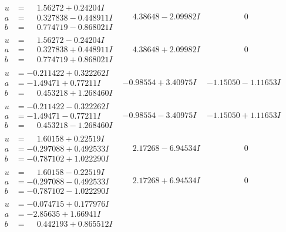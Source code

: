 \documentclass[1p]{elsarticle_modified}
\theoremstyle{definition}
\begin{document}
$$\begin{array}{c|c|c}
\begin{aligned}
u &= \phantom{-}1.56272 + 0.24204 I \\
a &= \phantom{-}0.327838 - 0.448911 I \\
b &= \phantom{-}0.774719 - 0.868021 I\end{aligned}
 & \phantom{-}4.38648 - 2.09982 I & \phantom{-0.000000 } 0 \\ \hline\begin{aligned}
u &= \phantom{-}1.56272 - 0.24204 I \\
a &= \phantom{-}0.327838 + 0.448911 I \\
b &= \phantom{-}0.774719 + 0.868021 I\end{aligned}
 & \phantom{-}4.38648 + 2.09982 I & \phantom{-0.000000 } 0 \\ \hline\begin{aligned}
u &= -0.211422 + 0.322262 I \\
a &= -1.49471 + 0.77211 I \\
b &= \phantom{-}0.453218 + 1.268460 I\end{aligned}
 & -0.98554 + 3.40975 I & -1.15050 - 1.11653 I \\ \hline\begin{aligned}
u &= -0.211422 - 0.322262 I \\
a &= -1.49471 - 0.77211 I \\
b &= \phantom{-}0.453218 - 1.268460 I\end{aligned}
 & -0.98554 - 3.40975 I & -1.15050 + 1.11653 I \\ \hline\begin{aligned}
u &= \phantom{-}1.60158 + 0.22519 I \\
a &= -0.297088 + 0.492533 I \\
b &= -0.787102 + 1.022290 I\end{aligned}
 & \phantom{-}2.17268 - 6.94534 I & \phantom{-0.000000 } 0 \\ \hline\begin{aligned}
u &= \phantom{-}1.60158 - 0.22519 I \\
a &= -0.297088 - 0.492533 I \\
b &= -0.787102 - 1.022290 I\end{aligned}
 & \phantom{-}2.17268 + 6.94534 I & \phantom{-0.000000 } 0 \\ \hline\begin{aligned}
u &= -0.074715 + 0.177976 I \\
a &= -2.85635 + 1.66941 I \\
b &= \phantom{-}0.442193 + 0.865512 I\end{aligned}

\end{array}$$
\end{document}
